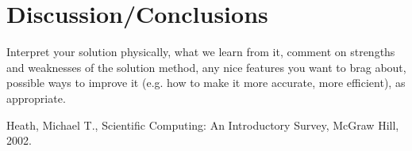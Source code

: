 \documentclass[11pt]{article}
\begin{document}
\section{Discussion/Conclusions}\label{S:5}
Interpret your solution physically, what we learn from it, comment on strengths and weaknesses of the solution method, any nice features you want to brag about, possible ways to improve it (e.g. how to make it more accurate, more efficient), as appropriate.


\begin{thebibliography}{100}
Heath, Michael T., Scientific Computing: An Introductory Survey, McGraw Hill, 2002.
%
%

\end{thebibliography}
\end{document}
